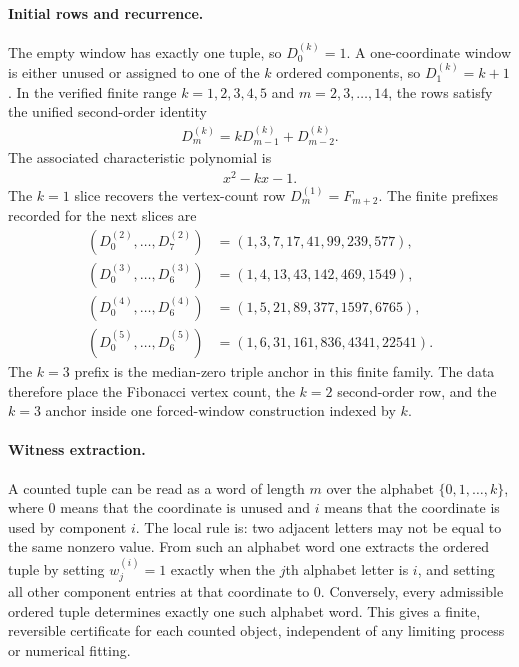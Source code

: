\paragraph{Initial rows and recurrence.}
The empty window has exactly one tuple, so $D^{(k)}_0=1$.  A one-coordinate window is either unused or assigned to one of the $k$ ordered components, so $D^{(k)}_1=k+1$.  In the verified finite range $k=1,2,3,4,5$ and $m=2,3,\ldots,14$, the rows satisfy the unified second-order identity
$$
\begin{aligned}
D^{(k)}_m=kD^{(k)}_{m-1}+D^{(k)}_{m-2}.
\end{aligned}
$$
The associated characteristic polynomial is
$$
\begin{aligned}
x^2-kx-1.
\end{aligned}
$$
The $k=1$ slice recovers the vertex-count row $D^{(1)}_m=F_{m+2}$.  The finite prefixes recorded for the next slices are
$$
\begin{aligned}
(D^{(2)}_0,\ldots,D^{(2)}_7)&=(1,3,7,17,41,99,239,577),\\
(D^{(3)}_0,\ldots,D^{(3)}_6)&=(1,4,13,43,142,469,1549),\\
(D^{(4)}_0,\ldots,D^{(4)}_6)&=(1,5,21,89,377,1597,6765),\\
(D^{(5)}_0,\ldots,D^{(5)}_6)&=(1,6,31,161,836,4341,22541).
\end{aligned}
$$
The $k=3$ prefix is the median-zero triple anchor in this finite family.  The data therefore place the Fibonacci vertex count, the $k=2$ second-order row, and the $k=3$ anchor inside one forced-window construction indexed by $k$.

\paragraph{Witness extraction.}
A counted tuple can be read as a word of length $m$ over the alphabet $\{0,1,\ldots,k\}$, where $0$ means that the coordinate is unused and $i$ means that the coordinate is used by component $i$.  The local rule is: two adjacent letters may not be equal to the same nonzero value.  From such an alphabet word one extracts the ordered tuple by setting $w^{(i)}_j=1$ exactly when the $j$th alphabet letter is $i$, and setting all other component entries at that coordinate to $0$.  Conversely, every admissible ordered tuple determines exactly one such alphabet word.  This gives a finite, reversible certificate for each counted object, independent of any limiting process or numerical fitting.

